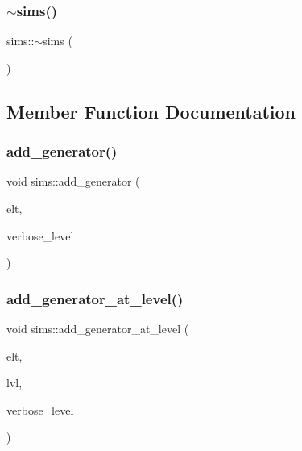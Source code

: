 \mbox{\label{classsims_a7cc925349e00203fae2e4a54ca3788b3}} 
\subsubsection{\texorpdfstring{$\sim$sims()}{~sims()}}
{\footnotesize\ttfamily sims\+::$\sim$sims (\begin{DoxyParamCaption}{ }\end{DoxyParamCaption})}



\subsection{Member Function Documentation}
\mbox{\label{classsims_add28c3fa3ed9825c7ccb4b1fb7ac22d4}} 
\subsubsection{\texorpdfstring{add\+\_\+generator()}{add\_generator()}}
{\footnotesize\ttfamily void sims\+::add\+\_\+generator (\begin{DoxyParamCaption}\item[{\mbox{\hyperlink{galois_8h_a09fddde158a3a20bd2dcadb609de11dc}{I\+NT}} $\ast$}]{elt,  }\item[{\mbox{\hyperlink{galois_8h_a09fddde158a3a20bd2dcadb609de11dc}{I\+NT}}}]{verbose\+\_\+level }\end{DoxyParamCaption})}

\mbox{\label{classsims_ac9f0f17058381524d70645e9d6893e4d}} 
\subsubsection{\texorpdfstring{add\+\_\+generator\+\_\+at\+\_\+level()}{add\_generator\_at\_level()}}
{\footnotesize\ttfamily void sims\+::add\+\_\+generator\+\_\+at\+\_\+level (\begin{DoxyParamCaption}\item[{\mbox{\hyperlink{galois_8h_a09fddde158a3a20bd2dcadb609de11dc}{I\+NT}} $\ast$}]{elt,  }\item[{\mbox{\hyperlink{galois_8h_a09fddde158a3a20bd2dcadb609de11dc}{I\+NT}}}]{lvl,  }\item[{\mbox{\hyperlink{galois_8h_a09fddde158a3a20bd2dcadb609de11dc}{I\+NT}}}]{verbose\+\_\+level }\end{DoxyParamCaption})}

